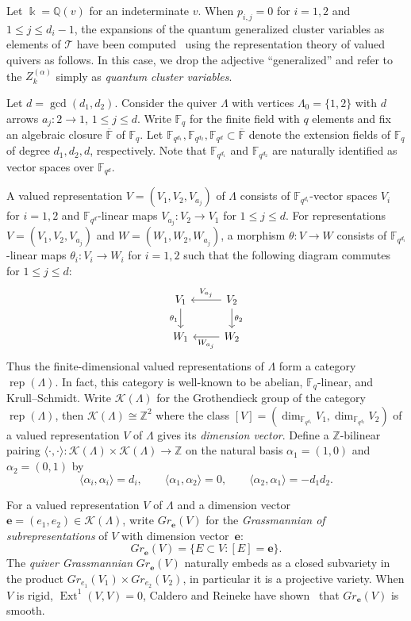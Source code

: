 \documentclass[ALCO,ThmDefs,Unicode,epreuves]{cedram}
\newcommand{\bfe}{\mathbf{e}}
\newcommand{\cK}{\mathcal{K}}
\newcommand{\cT}{\mathcal{T}}
\newcommand{\FF}{\mathbb{F}}
\newcommand{\kk}{\Bbbk}
\newcommand{\QQ}{\mathbb{Q}}
\newcommand{\ZZ}{\mathbb{Z}}
\DeclareMathOperator{\Ext}{Ext}
\DeclareMathOperator{\rep}{rep}
\begin{document}
Let $\kk=\QQ(v)$ for an indeterminate $v$. 
When $p_{i,j}=0$ for $i=1,2$ and $1\le j\le d_i-1$, the expansions of the quantum generalized cluster variables as elements of $\cT$ have been computed~\cite{rupel0} using the representation theory of valued quivers as follows.
In this case, we drop the adjective ``generalized'' and refer to the $Z^{(\alpha)}_k$ simply as \emph{quantum cluster variables}.

Let $d=\gcd(d_1,d_2)$.
Consider the quiver $\Lambda$ with vertices $\Lambda_0=\{1,2\}$ with $d$ arrows $a_j:2\to1$, $1\le j\le d$.
Write $\FF_q$ for the finite field with $q$ elements and fix an algebraic closure $\overline{\FF}$ of $\FF_q$.
Let $\FF_{q^{d_1}},\FF_{q^{d_2}},\FF_{q^d}\subset\overline{\FF}$ denote the extension fields of $\FF_q$ of degree $d_1,d_2,d$, respectively.
Note that $\FF_{q^{d_1}}$ and $\FF_{q^{d_2}}$ are naturally identified as vector spaces over $\FF_{q^d}$.

A valued representation $V=(V_1,V_2,V_{a_j})$ of $\Lambda$ consists of $\FF_{q^{d_i}}$-vector spaces $V_i$ for $i=1,2$ and $\FF_{q^d}$-linear maps $V_{a_j}:V_2\to V_1$ for $1\le j\le d$.
For representations $V=(V_1,V_2,V_{a_j})$ and $W=(W_1,W_2,W_{a_j})$, a morphism $\theta:V\to W$ consists of $\FF_{q^{d_i}}$-linear maps $\theta_i:V_i\to W_i$ for $i=1,2$ such that the following diagram commutes for $1\le j\le d$:
\[\begin{tikzcd}
 V_1\arrow["\theta_1"']{d}& V_2 \arrow["V_{a_j}"']{l}\arrow["\theta_2"]{d}\\
 W_1 & W_2 \arrow["W_{a_j}"]{l}
 \end{tikzcd}\]
Thus the finite-dimensional valued representations of $\Lambda$ form a category $\rep(\Lambda)$.
In fact, this category is well-known to be abelian, $\FF_q$-linear, and Krull--Schmidt.
Write $\cK(\Lambda)$ for the Grothendieck group of the category $\rep(\Lambda)$, then $\cK(\Lambda)\cong\ZZ^2$ where the class $[V]=(\dim_{\FF_{q^{d_1}}}\!\!\!V_1,\dim_{\FF_{q^{d_2}}}\!\!\!V_2)$ of a valued representation $V$ of $\Lambda$ gives its \emph{dimension vector}.
Define a $\ZZ$-bilinear pairing $\langle\cdot,\cdot\rangle:\cK(\Lambda)\times\cK(\Lambda)\to\ZZ$ on the natural basis $\alpha_1=(1,0)$ and $\alpha_2=(0,1)$ by
\[\langle\alpha_i,\alpha_i\rangle=d_i,\qquad\langle\alpha_1,\alpha_2\rangle=0,\qquad\langle\alpha_2,\alpha_1\rangle=-d_1d_2.\]

For a valued representation $V$ of $\Lambda$ and a dimension vector $\bfe=(e_1,e_2)\in\cK(\Lambda)$, write $Gr_\bfe(V)$ for the \emph{Grassmannian of subrepresentations} of $V$ with dimension vector~$\bfe$:
\[Gr_\bfe(V)=\{E\subset V:[E]=\bfe\}.\]
The \emph{quiver Grassmannian} $Gr_\bfe(V)$ naturally embeds as a closed subvariety in the product $Gr_{e_1}(V_1)\times Gr_{e_2}(V_2)$, in particular it is a projective variety.
When $V$ is rigid, \ie $\Ext^1(V,V)=0$, Caldero and Reineke have shown~\cite{caldero-reineke} that $Gr_\bfe(V)$ is smooth.
\end{document}
